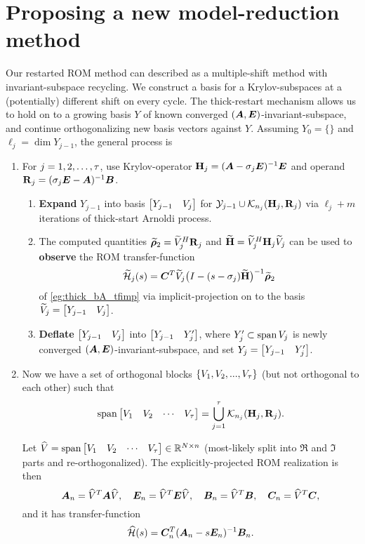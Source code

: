 \section{Proposing a new model-reduction method}\label{sec:new_method}
Our restarted ROM method can described as a multiple-shift method with invariant-subspace recycling.   We construct a basis for a Krylov-subspaces at a (potentially) different shift on every cycle.  The thick-restart mechanism allows us to hold on to a growing basis $Y$ of known converged $(\bm{A},\bm{E})$-invariant-subspace, and continue orthogonalizing new basis vectors against $Y$.  Assuming $Y_0 = \{\}$ and $\ell_j = \dim Y_{j-1}$, the general process is 
\begin{enumerate}
\item For $j=1,2,\ldots,\tau$, use Krylov-operator $\textbf{\textup{H}}_j = (\bm{A}-\sigma_j \bm{E})^{-1}\bm{E}$ and operand $\textbf{\textup{R}}_j= (\sigma_j \bm{E} - \bm{A})^{-1}\bm{B}$. 
\begin{enumerate}
\item \textbf{Expand} $Y_{j-1}$ into basis $\begin{bmatrix} Y_{j-1} & V_j\end{bmatrix}$ for $\mathcal{Y}_{j-1} \cup \mathcal{K}_{n_j}({\textbf{\textup{H}}_j},{\textbf{\textup{R}}_j})$ via $\ell_j+m$ iterations of thick-start Arnoldi process.  

\item  The computed quantities $\widetilde{\boldsymbol{\rho}}_2 =\widetilde{V}_j^H \textbf{\textup{R}}_j$ and $\widetilde{\textbf{\textup{H}}} = \widetilde{V}_j^H \textbf{\textup{H}}_j \widetilde{V}_j$ can be used to \textbf{observe} the ROM transfer-function 
\[
\widetilde{\mathcal{H}}_j(s)=\bm{C}^T \widetilde{V}_j \big( I - (s-\sigma_j) \widetilde{\textbf{\textup{H}}} \big)^{-1} \widetilde{\boldsymbol{\rho}}_2
\]
 of \eqref{eg:thick_bA_tfimp} via implicit-projection on to the basis $\widetilde{V}_j = \begin{bmatrix} Y_{j-1} & V_j\end{bmatrix}$.

\item \textbf{Deflate} $\begin{bmatrix} Y_{j-1} & V_j\end{bmatrix}$ into $\begin{bmatrix} Y_{j-1} &Y^\prime_j\end{bmatrix}$, where       $Y^\prime_j\subset\operatorname*{span} V_j$ is newly converged $(\bm{A},\bm{E})$-invariant-subspace, and set $Y_j = \begin{bmatrix} Y_{j-1} &Y^\prime_j\end{bmatrix}$. 
\end{enumerate}

\item Now we have a set of orthogonal blocks $\{ V_1, V_2, ...,V_\tau\}$ (but not orthogonal to each other) such that 
\[
\operatorname*{span} \begin{bmatrix} V_1& V_2& \cdots&V_\tau\end{bmatrix} = \bigcup_{j=1}^\tau \mathcal{K}_{n_j}({\textbf{\textup{H}}_j},{\textbf{\textup{R}}_j}).
\] 

Let $\widehat{V} = \operatorname*{span}\begin{bmatrix} V_1& V_2& \cdots&V_\tau\end{bmatrix}\in\mathbb{R}^{N\times n}$  (most-likely split into $\Re$ and $\Im$ parts and re-orthogonalized). The explicitly-projected ROM realization is then 
\[
\bm{A}_n = \widehat{V}^T \bm{A} \widehat{V},\quad 
\bm{E}_n = \widehat{V}^T \bm{E} \widehat{V}, \quad
\bm{B}_n = \widehat{V}^T \bm{B},\quad
\bm{C}_n = \widehat{V}^T \bm{C},
\]
and it has transfer-function 
\[
\widehat{\mathcal{H}}(s) = \bm{C}_n^T (\bm{A}_n - s \bm{E}_n )^{-1} \bm{B}_n. 
\]
\end{enumerate}


